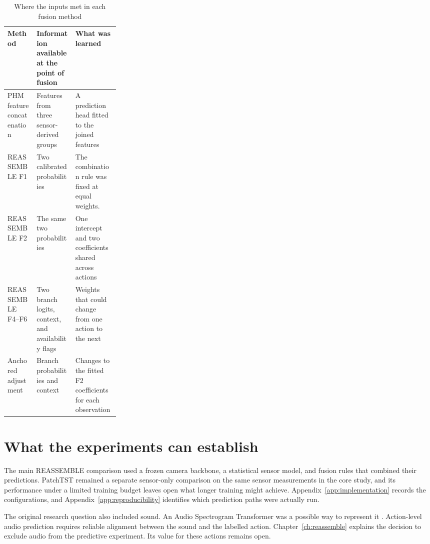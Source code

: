 \begin{table}[htbp]
\centering
\caption{Where the inputs met in each fusion method}
\label{tab:ch3-fusion-interfaces}
\small\singlespacing
\setlength{\tabcolsep}{4pt}
\renewcommand{\arraystretch}{1.15}
\begin{tabularx}{\linewidth}{@{}P{0.26\linewidth}YY@{}}
\toprule
\textbf{Method} & \textbf{Information available at the point of fusion} & \textbf{What
was learned} \\
\midrule
PHM feature concatenation & Features from three sensor-derived groups & A prediction
head fitted to the joined features \\
REASSEMBLE F1 & Two calibrated probabilities & The combination rule was fixed at equal weights. \\
REASSEMBLE F2 & The same two probabilities & One intercept and two coefficients shared
across actions \\
REASSEMBLE F4--F6 & Two branch logits, context, and availability flags & Weights that
could change from one action to the next \\
Anchored adjustment & Branch probabilities and context & Changes to the fitted F2
coefficients for each observation \\
\bottomrule
\end{tabularx}
\end{table}

\section{What the experiments can establish}

The main REASSEMBLE comparison used a frozen camera backbone, a statistical sensor
model, and fusion rules that combined their predictions. PatchTST remained a separate
sensor-only comparison on the same sensor measurements in the core study, and its
performance under a limited training budget leaves open what longer
training might achieve. Appendix~\ref{app:implementation} records the configurations,
and Appendix~\ref{app:reproducibility} identifies which prediction paths were actually
run.

The original research question also included sound. An Audio Spectrogram Transformer was
a possible way to represent it \parencite{P011}. Action-level audio prediction requires
reliable alignment between the sound and the labelled action. Chapter~\ref{ch:reassemble}
explains the decision to exclude audio from the predictive experiment. Its value for
these actions remains open.


